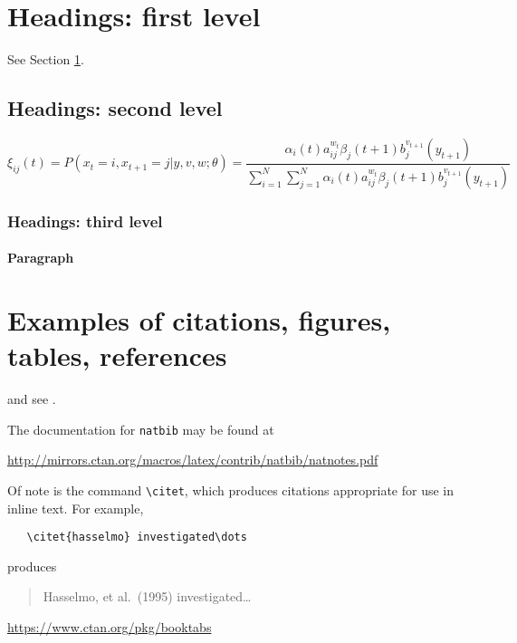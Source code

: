 \documentclass{article}
\begin{document}
\section{Headings: first level}
\label{sec:headings}

\lipsum[4] See Section \ref{sec:headings}.

\subsection{Headings: second level}
\lipsum[5]
\begin{equation}
\xi _{ij}(t)=P(x_{t}=i,x_{t+1}=j|y,v,w;\theta)= {\frac {\alpha _{i}(t)a^{w_t}_{ij}\beta _{j}(t+1)b^{v_{t+1}}_{j}(y_{t+1})}{\sum _{i=1}^{N} \sum _{j=1}^{N} \alpha _{i}(t)a^{w_t}_{ij}\beta _{j}(t+1)b^{v_{t+1}}_{j}(y_{t+1})}}
\end{equation}

\subsubsection{Headings: third level}
\lipsum[6]

\paragraph{Paragraph}

\lipsum[7]

\section{Examples of citations, figures, tables, references}
\label{sec:others}
\lipsum[8] \cite{dhariwal2021,kour2014fast} and see \cite{hadash2018estimate}.

The documentation for \verb+natbib+ may be found at
\begin{center}
  \url{http://mirrors.ctan.org/macros/latex/contrib/natbib/natnotes.pdf}
\end{center}
Of note is the command \verb+\citet+, which produces citations
appropriate for use in inline text.  For example,
\begin{verbatim}
   \citet{hasselmo} investigated\dots
\end{verbatim}
produces
\begin{quote}
  Hasselmo, et al.\ (1995) investigated\dots
\end{quote}

\begin{center}
  \url{https://www.ctan.org/pkg/booktabs}
\end{center}
\end{document}
